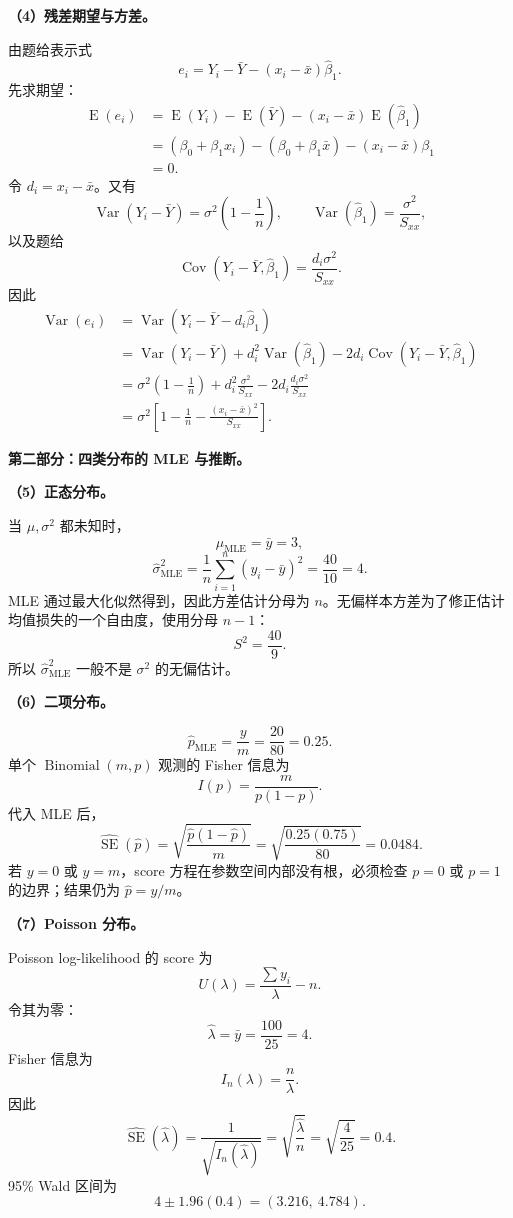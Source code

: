 \documentclass[11pt,a4paper]{article}
\newcommand{\E}{\operatorname{E}}
\newcommand{\Var}{\operatorname{Var}}
\newcommand{\Cov}{\operatorname{Cov}}
\newcommand{\SE}{\operatorname{SE}}
\begin{document}
\begin{solutionbox}
\textbf{（4）残差期望与方差。}

由题给表示式
\[
  e_i=Y_i-\bar Y-(x_i-\bar x)\hat\beta_1.
\]
先求期望：
\[
\begin{aligned}
  \E(e_i)
  &=
  \E(Y_i)-\E(\bar Y)-(x_i-\bar x)\E(\hat\beta_1)\\
  &=
  (\beta_0+\beta_1x_i)-(\beta_0+\beta_1\bar x)
  -(x_i-\bar x)\beta_1\\
  &=
  \boxed{0}.
\end{aligned}
\]
令 $d_i=x_i-\bar x$。又有
\[
  \Var(Y_i-\bar Y)=\sigma^2\left(1-\frac1n\right),
  \qquad
  \Var(\hat\beta_1)=\frac{\sigma^2}{S_{xx}},
\]
以及题给
\[
  \Cov(Y_i-\bar Y,\hat\beta_1)
  =
  \frac{d_i\sigma^2}{S_{xx}}.
\]
因此
\[
\begin{aligned}
  \Var(e_i)
  &=
  \Var(Y_i-\bar Y-d_i\hat\beta_1)\\
  &=
  \Var(Y_i-\bar Y)+d_i^2\Var(\hat\beta_1)
  -2d_i\Cov(Y_i-\bar Y,\hat\beta_1)\\
  &=
  \sigma^2\left(1-\frac1n\right)
  +d_i^2\frac{\sigma^2}{S_{xx}}
  -2d_i\frac{d_i\sigma^2}{S_{xx}}\\
  &=
  \boxed{
  \sigma^2\left[
    1-\frac1n-\frac{(x_i-\bar x)^2}{S_{xx}}
  \right]}.
\end{aligned}
\]

\textbf{第二部分：四类分布的 MLE 与推断。}

\textbf{（5）正态分布。}

当 $\mu,\sigma^2$ 都未知时，
\[
  \boxed{\hat\mu_{\mathrm{MLE}}=\bar y=3},
\]
\[
  \boxed{
  \hat\sigma^2_{\mathrm{MLE}}
  =
  \frac1n\sum_{i=1}^n(y_i-\bar y)^2
  =
  \frac{40}{10}
  =
  4.
  }
\]
MLE 通过最大化似然得到，因此方差估计分母为 $n$。无偏样本方差为了修正估计均值损失的一个自由度，使用分母 $n-1$：
\[
  S^2=\frac{40}{9}.
\]
所以 $\hat\sigma^2_{\mathrm{MLE}}$ 一般不是 $\sigma^2$ 的无偏估计。

\textbf{（6）二项分布。}

\[
  \boxed{\hat p_{\mathrm{MLE}}=\frac{y}{m}=\frac{20}{80}=0.25.}
\]
单个 $\operatorname{Binomial}(m,p)$ 观测的 Fisher 信息为
\[
  I(p)=\frac{m}{p(1-p)}.
\]
代入 MLE 后，
\[
  \widehat{\SE}(\hat p)
  =
  \sqrt{\frac{\hat p(1-\hat p)}m}
  =
  \sqrt{\frac{0.25(0.75)}{80}}
  =
  \boxed{0.0484}.
\]
若 $y=0$ 或 $y=m$，score 方程在参数空间内部没有根，必须检查 $p=0$ 或 $p=1$ 的边界；结果仍为 $\hat p=y/m$。

\textbf{（7）Poisson 分布。}

Poisson log-likelihood 的 score 为
\[
  U(\lambda)
  =
  \frac{\sum y_i}{\lambda}-n.
\]
令其为零：
\[
  \boxed{
  \hat\lambda
  =
  \bar y
  =
  \frac{100}{25}
  =
  4.
  }
\]
Fisher 信息为
\[
  \boxed{I_n(\lambda)=\frac n\lambda.}
\]
因此
\[
  \widehat{\SE}(\hat\lambda)
  =
  \frac1{\sqrt{I_n(\hat\lambda)}}
  =
  \sqrt{\frac{\hat\lambda}{n}}
  =
  \sqrt{\frac4{25}}
  =
  0.4.
\]
95\% Wald 区间为
\[
  4\pm1.96(0.4)
  =
  \boxed{(3.216,\ 4.784)}.
\]


\end{solutionbox}
\end{document}
